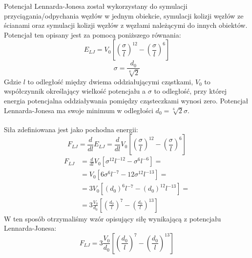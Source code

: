 \documentclass[12pt, letterpaper]{report}
\begin{document}
    Potencjał Lennarda-Jonesa został wykorzystany do symulacji przyciągania/odpychania 
    węzłów w jednym obiekcie, symulacji kolizji węzłów ze ścianami oraz symulacji
    kolizji węzłów z węzłami należącymi do innych obiektów. 
    Potencjał ten opisany jest za pomocą poniższego równania:
    \begin{equation}
        E_{LJ} = V_0 \left[ \left( \frac{\sigma}{l} \right)^{12} - \left( \frac{\sigma}{l} \right)^{6} \right]
    \end{equation}
    \begin{equation}
        \sigma = \frac{d_0}{\sqrt[6]{2}}
    \end{equation}
    Gdzie $l$ to odległość między dwiema oddziałującymi cząstkami, $V_0$ to współczynnik określający wielkość potencjału 
    a $\sigma$ to odległość, przy której energia potencjalna oddziaływania pomiędzy cząsteczkami wynosi zero. 
    Potencjał Lennarda-Jonesa ma swoje minimum w odległości $d_0 = \sqrt[6]{2} \sigma$. \\ \\
    Siła zdefiniowana jest jako pochodna energii:
    \begin{equation}
        F_{LJ} = 
        \frac{d}{dl} E_{LJ} = 
        \frac{d}{dl} V_0 \left[ \left( \frac{\sigma}{l} \right)^{12} - \left( \frac{\sigma}{l} \right)^{6} \right]
    \end{equation}
    \begin{align*}
        F_{LJ} &= \frac{d}{dl} V_0 \left[ \sigma^{12}l^{-12} - \sigma^{6}l^{-6} \right] =\\
        &= V_0 \left[ 6\sigma^{6}l^{-7} - 12\sigma^{12}l^{-13} \right] =\\
        &= 3 V_0 \left[ (d_{0})^{6} l^{-7} - (d_{0})^{12} l^{-13} \right] =\\
        &= 3\frac{V_0}{d_0} \left[ \left(\frac{d_0}{l}\right)^{7} - \left(\frac{d_0}{l}\right)^{13} \right]
    \end{align*}
    W ten sposób otrzymaliśmy wzór opisujący siłę wynikającą z potencjału Lennarda-Jonesa:
    \begin{equation}
        F_{LJ} = 3\frac{V_0}{d_0} \left[ \left(\frac{d_0}{l}\right)^{7} - \left(\frac{d_0}{l}\right)^{13} \right]
    \end{equation}

    \clearpage
\end{document}
